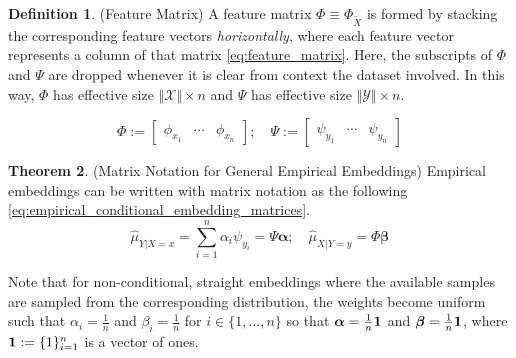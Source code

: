 \documentclass[twoside]{article} \usepackage{aistats2017}
\theoremstyle{definition}
\newtheorem{theorem}{Theorem}[section]
\newtheorem{definition}[theorem]{Definition}
\newcommand{\rv}[1]{{#1}}
\newcommand{\ds}[1]{\tilde{#1}}
\newcommand{\hatmuYx}{\hat{\mu}_{\rv{Y} | \rv{X} = x}}
\newcommand{\hatmuXy}{\hat{\mu}_{\rv{X} | \rv{Y} = y}}
\newcommand{\cardX}{\Vert \mathcal{X} \Vert}
\newcommand{\cardY}{\Vert \mathcal{Y} \Vert}
\begin{document}
%			
%			
%			
			\begin{definition} \label{def:feature_matrix}
				(Feature Matrix)
				A feature matrix $\Phi \equiv \Phi_{\ds{X}}$ is formed by stacking the corresponding feature vectors \textit{horizontally}, where each feature vector represents a column of that matrix \eqref{eq:feature_matrix}. Here, the subscripts of $\Phi$ and $\Psi$ are dropped whenever it is clear from context the dataset involved. In this way, $\Phi$ has effective size $\cardX \times n$ and $\Psi$ has effective size $\cardY \times n$.	
				
				\begin{equation}
					\Phi := \begin{bmatrix} \phi_{x_{1}} & \cdots & \phi_{x_{n}} \end{bmatrix}; \quad
					\Psi := \begin{bmatrix} \psi_{y_{1}} & \cdots & \psi_{y_{n}} \end{bmatrix}
				\label{eq:feature_matrix}
				\end{equation}
				
		
			\end{definition} 

			\begin{theorem} \label{thm:empirical_embedding_matrices}
				(Matrix Notation for General Empirical Embeddings)
				Empirical embeddings can be written with matrix notation as the following \eqref{eq:empirical_conditional_embedding_matrices}.
				\begin{equation}
					\hatmuYx = \sum_{i = 1}^{n} \alpha_{i} \psi_{y_{i}} = \Psi \bm{\alpha} ;\quad \hatmuXy = \Phi \bm{\beta}
				\label{eq:empirical_conditional_embedding_matrices}
				\end{equation}
				
				Note that for non-conditional, straight embeddings where the available samples are sampled from the corresponding distribution, the weights become uniform such that $\alpha_{i} = \frac{1}{n}$ and $\beta_{i} = \frac{1}{n}$ for $i \in \{1, \dots, n\}$ so that $\bm{\alpha} = \frac{1}{n} \mathbf{1}$ and $\bm{\beta} = \frac{1}{n} \mathbf{1}$, where $\mathbf{1} := \{1\}_{i = 1}^{n}$ is a vector of ones.
			\end{theorem}
			
\end{document}
